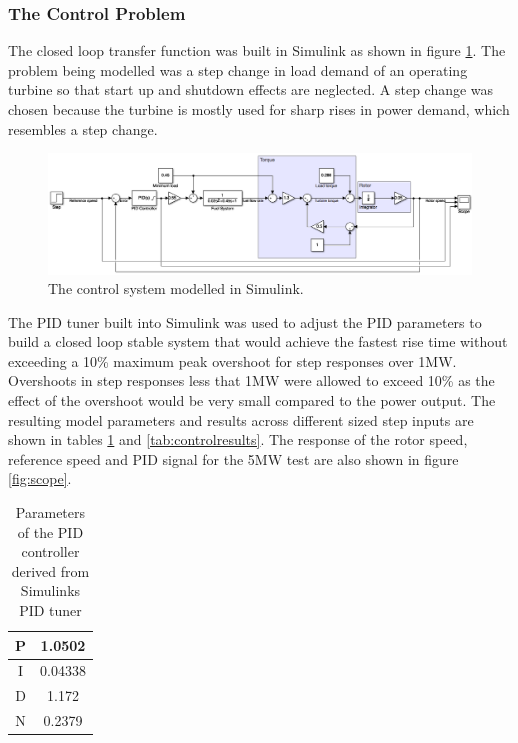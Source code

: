 \documentclass[11pt, oneside]{article}
\begin{document}
 \begin{landscape}
\subsubsection{The Control Problem}
The closed loop transfer function was built in Simulink as shown in figure \ref{fig:controlsimulink}. The problem being modelled was a step change in load demand of an operating turbine so that start up and shutdown effects are neglected. A step change was chosen because the turbine is mostly used for sharp rises in power demand, which resembles a step change. 
\begin{figure} [h]
\centering
\includegraphics[width=1\textwidth]{./pictures/controlsimulink.png}
 \caption{The control system modelled in Simulink.} \label{fig:controlsimulink} 
 \end{figure}
 The PID tuner built into Simulink was used to adjust the PID parameters to build a closed loop stable system that would achieve the fastest rise time without exceeding a 10\% maximum peak overshoot for step responses over 1MW. Overshoots in step responses less that 1MW were allowed to exceed 10\% as the effect of the overshoot would be very small compared to the power output. The resulting model parameters and results across different sized step inputs are shown in tables \ref{tab:PID} and \ref{tab:controlresults}. The response of the rotor speed, reference speed and PID signal for the 5MW test are also shown in figure \ref{fig:scope}. 
 \end{landscape}

 \begin {table} [h]
\begin{center}
\caption{Parameters of the PID controller derived from Simulinks PID tuner} \label{tab:PID} 
\begin{tabular}{ |c|c| }
 \hline
  P & 1.0502\\ 
 \hline
  I & 0.04338\\ 
  \hline
  D & 1.172\\ 
 \hline
 N & 0.2379\\
 \hline
\end{tabular}
\end{center}  
\end {table}
\end{document}
